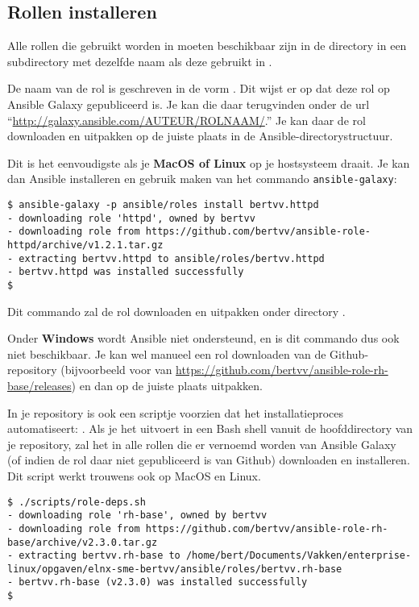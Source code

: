 \subsection{Rollen installeren}%
\label{sub:rollen-installeren}

Alle rollen die gebruikt worden in  moeten beschikbaar zijn in de directory  in een subdirectory met dezelfde naam als deze gebruikt in .

De naam van de rol  is geschreven in de vorm . Dit wijst er op dat deze rol op Ansible Galaxy gepubliceerd is. Je kan die daar terugvinden onder de url ``\url{http://galaxy.ansible.com/AUTEUR/ROLNAAM/}.'' Je kan daar de rol downloaden en uitpakken op de juiste plaats in de Ansible-directorystructuur.

Dit is het eenvoudigste als je \textbf{MacOS of Linux} op je hostsysteem draait. Je kan dan Ansible installeren en gebruik maken van het commando \texttt{ansible-galaxy}:

\begin{verbatim}
$ ansible-galaxy -p ansible/roles install bertvv.httpd
- downloading role 'httpd', owned by bertvv
- downloading role from https://github.com/bertvv/ansible-role-httpd/archive/v1.2.1.tar.gz
- extracting bertvv.httpd to ansible/roles/bertvv.httpd
- bertvv.httpd was installed successfully
$
\end{verbatim}

Dit commando zal de rol  downloaden en uitpakken onder directory .

Onder \textbf{Windows} wordt Ansible niet ondersteund, en is dit commando dus ook niet beschikbaar. Je kan wel manueel een rol downloaden van de Github-repository (bijvoorbeeld voor  van \url{https://github.com/bertvv/ansible-role-rh-base/releases}) en dan op de juiste plaats uitpakken.

In je repository is ook een scriptje voorzien dat het installatieproces automatiseert: . Als je het uitvoert in een Bash shell vanuit de hoofddirectory van je repository, zal het in  alle rollen die er vernoemd worden van Ansible Galaxy (of indien de rol daar niet gepubliceerd is van Github) downloaden en installeren. Dit script werkt trouwens ook op MacOS en Linux.

\begin{verbatim}
$ ./scripts/role-deps.sh 
- downloading role 'rh-base', owned by bertvv
- downloading role from https://github.com/bertvv/ansible-role-rh-base/archive/v2.3.0.tar.gz
- extracting bertvv.rh-base to /home/bert/Documents/Vakken/enterprise-linux/opgaven/elnx-sme-bertvv/ansible/roles/bertvv.rh-base
- bertvv.rh-base (v2.3.0) was installed successfully
$ 
\end{verbatim}

